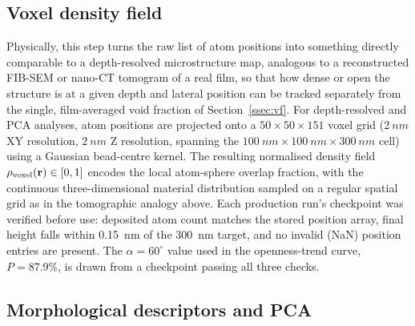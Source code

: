 \documentclass[aip,amsmath,amssymb,reprint]{revtex4-1}
\newcommand{\dang}{\ensuremath{\alpha}}
\newcommand{\bsP}{\ensuremath{P}}
\begin{document}
\subsection{Voxel density field}
\label{ssec:voxel}

Physically, this step turns the raw list of atom positions into something
directly comparable to a depth-resolved microstructure map, analogous to a
reconstructed FIB-SEM or nano-CT tomogram of a real film, so that how dense
or open the structure is at a given depth and lateral position can be
tracked separately from the single, film-averaged void fraction of
Section~\ref{ssec:vf}.
For depth-resolved and PCA analyses, atom positions are projected onto a
$50 \times 50 \times 151$ voxel grid ($\SI{2}{nm}$ XY resolution,
$\SI{2}{nm}$ Z resolution, spanning the
$\SI{100}{nm}\times\SI{100}{nm}\times\SI{300}{nm}$ cell)
using a Gaussian bead-centre kernel.  The resulting
normalised density field $\rho_{\rm voxel}(\mathbf{r}) \in [0,1]$
encodes the local atom-sphere overlap fraction, with the continuous
three-dimensional material distribution sampled on a regular spatial grid
as in the tomographic analogy above.
Each production run's checkpoint was verified before use: deposited atom
count matches the stored position array, final height falls within
\SI{0.15}{nm} of the \SI{300}{nm} target, and no invalid (NaN) position
entries are present. The $\dang = 60^{\circ}$ value used in the
openness-trend curve, $\bsP = 87.9\%$, is drawn from a checkpoint passing
all three checks.

\subsection{Morphological descriptors and PCA}
\label{ssec:pca}
\end{document}
